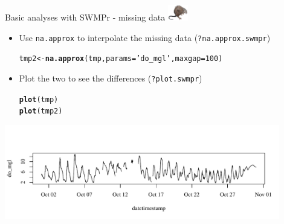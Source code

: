 \documentclass[xcolor=dvipsnames]{beamer}\usepackage[]{graphicx}\usepackage[]{color}
\makeatletter
\newcommand{\hlnum}[1]{\textcolor[rgb]{0.686,0.059,0.569}{#1}}%
\newcommand{\hlstr}[1]{\textcolor[rgb]{0.192,0.494,0.8}{#1}}%
\newcommand{\hlstd}[1]{\textcolor[rgb]{0.345,0.345,0.345}{#1}}%
\newcommand{\hlkwb}[1]{\textcolor[rgb]{0.69,0.353,0.396}{#1}}%
\newcommand{\hlkwc}[1]{\textcolor[rgb]{0.333,0.667,0.333}{#1}}%
\newcommand{\hlkwd}[1]{\textcolor[rgb]{0.737,0.353,0.396}{\textbf{#1}}}%
\newenvironment{kframe}{%
 \def\at@end@of@kframe{}%
 \ifinner\ifhmode%
  \def\at@end@of@kframe{\end{minipage}}%
  \begin{minipage}{\columnwidth}%
 \fi\fi%
 \def\FrameCommand##1{\hskip\@totalleftmargin \hskip-\fboxsep
 \colorbox{shadecolor}{##1}\hskip-\fboxsep
     \hskip-\linewidth \hskip-\@totalleftmargin \hskip\columnwidth}%
 \MakeFramed {\advance\hsize-\width
   \@totalleftmargin\z@ \linewidth\hsize
   \@setminipage}}%
 {\par\unskip\endMakeFramed%
 \at@end@of@kframe}
\newenvironment{knitrout}{}{} %
\makeatother
\begin{document}
\begin{frame}[fragile]{Basic analyses with SWMPr - missing data \includegraphics[width = 0.065\textwidth]{imgs/swmprat.png}}
\begin{itemize}
\item {}
Use \texttt{na.approx} to interpolate the missing data (\texttt{?na.approx.swmpr})
\begin{knitrout}\scriptsize
{}\color{fgcolor}\begin{kframe}
\begin{alltt}
\hlstd{tmp2} \hlkwb{<-} \hlkwd{na.approx}\hlstd{(tmp,} \hlkwc{params} \hlstd{=} \hlstr{'do_mgl'}\hlstd{,} \hlkwc{maxgap} \hlstd{=} \hlnum{100}\hlstd{)}
\end{alltt}
\end{kframe}
\end{knitrout}
\vspace{0.1in}
\item {}
Plot the two to see the differences (\texttt{?plot.swmpr})
\begin{knitrout}\scriptsize
{}\color{fgcolor}\begin{kframe}
\begin{alltt}
\hlkwd{plot}\hlstd{(tmp)}
\hlkwd{plot}\hlstd{(tmp2)}
\end{alltt}
\end{kframe}
\end{knitrout}
\end{itemize}
\vspace{-0.4in}
\begin{knitrout}\scriptsize
{}\color{fgcolor}

{\centering \includegraphics[width=0.9\textwidth]{figure/unnamed-chunk-9-1} 

}




\end{knitrout}
\end{frame}
\end{document}
